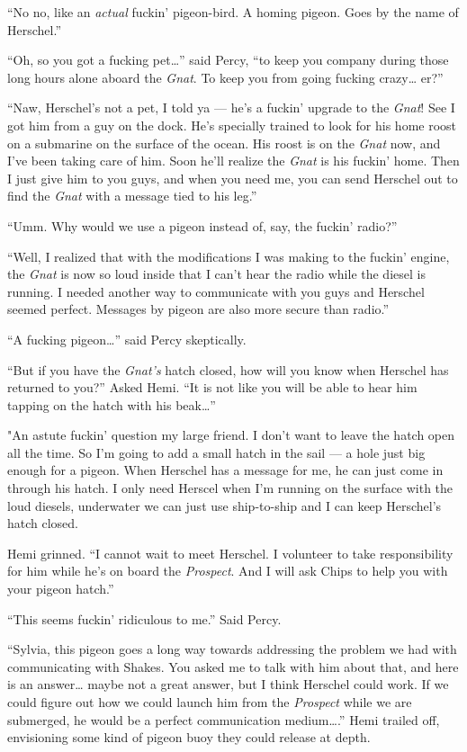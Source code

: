 \documentclass[]{scrbook}
\begin{document}
``No no, like an \emph{actual} fuckin' pigeon-bird. A homing pigeon.
Goes by the name of Herschel.''

``Oh, so you got a fucking pet\ldots{}'' said Percy, ``to keep you
company during those long hours alone aboard the \emph{Gnat}. To keep
you from going fucking crazy\ldots{} er?''

``Naw, Herschel's not a pet, I told ya --- he's a fuckin' upgrade to the
\emph{Gnat}! See I got him from a guy on the dock. He's specially
trained to look for his home roost on a submarine on the surface of the
ocean. His roost is on the \emph{Gnat} now, and I've been taking care of
him. Soon he'll realize the \emph{Gnat} is his fuckin' home. Then I just
give him to you guys, and when you need me, you can send Herschel out to
find the \emph{Gnat} with a message tied to his leg.''

``Umm. Why would we use a pigeon instead of, say, the fuckin' radio?''

``Well, I realized that with the modifications I was making to the
fuckin' engine, the \emph{Gnat} is now so loud inside that I can't hear
the radio while the diesel is running. I needed another way to
communicate with you guys and Herschel seemed perfect. Messages by
pigeon are also more secure than radio.''

``A fucking pigeon\ldots{}'' said Percy skeptically.

``But if you have the \emph{Gnat's} hatch closed, how will you know when
Herschel has returned to you?'' Asked Hemi. ``It is not like you will be
able to hear him tapping on the hatch with his beak\ldots{}''

"An astute fuckin' question my large friend. I don't want to leave the
hatch open all the time. So I'm going to add a small hatch in the sail
--- a hole just big enough for a pigeon. When Herschel has a message for
me, he can just come in through his hatch. I only need Herscel when I'm
running on the surface with the loud diesels, underwater we can just use
ship-to-ship and I can keep Herschel's hatch closed.

Hemi grinned. ``I cannot wait to meet Herschel. I volunteer to take
responsibility for him while he's on board the \emph{Prospect}. And I
will ask Chips to help you with your pigeon hatch.''

``This seems fuckin' ridiculous to me.'' Said Percy.

``Sylvia, this pigeon goes a long way towards addressing the problem we
had with communicating with Shakes. You asked me to talk with him about
that, and here is an answer\ldots{} maybe not a great answer, but I
think Herschel could work. If we could figure out how we could launch
him from the \emph{Prospect} while we are submerged, he would be a
perfect communication medium\ldots{}.'' Hemi trailed off, envisioning
some kind of pigeon buoy they could release at depth.
\end{document}
